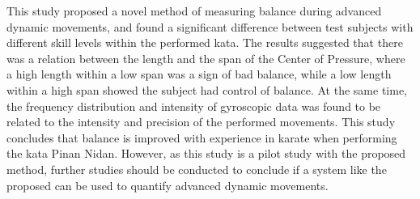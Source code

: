 



This study proposed a novel method of measuring balance during advanced dynamic movements, and found a significant difference between test subjects with different skill levels within the performed kata. The results suggested that there was a relation between the length and the span of the Center of Pressure, where a high length within a low span was a sign of bad balance, while a low length within a high span showed the subject had control of balance. At the same time, the frequency distribution and intensity of gyroscopic data was found to be related to the intensity and precision of the performed movements. This study concludes that balance is improved with experience in karate when performing the kata Pinan Nidan. However, as this study is a pilot study with the proposed method, further studies should be conducted to conclude if a system like the proposed can be used to quantify advanced dynamic movements.

\vspace{2cm}